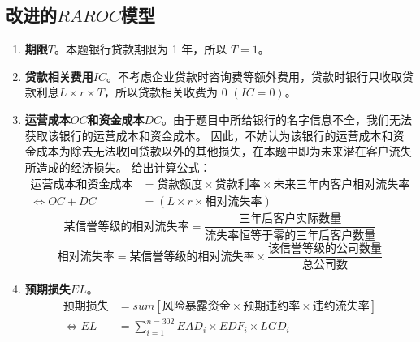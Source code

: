 \documentclass[withoutpreface,bwprint]{cumcmthesis}
\begin{document}
    \subsection{改进的$RAROC$模型}
        \begin{enumerate}
            \item \textbf{期限$T$}。本题银行贷款期限为 1 年，所以 $T = 1$。
            \item \textbf{贷款相关费用$IC$}。不考虑企业贷款时咨询费等额外费用，贷款时银行只收取贷款利息$L \times r \times T$，所以贷款相关收费为 0 $(IC = 0)$。
            \item \textbf{运营成本$OC$和资金成本$DC$}。由于题目中所给银行的名字信息不全，我们无法获取该银行的运营成本和资金成本。
                  因此，不妨认为该银行的运营成本和资金成本为除去无法收回贷款以外的其他损失，在本题中即为未来潜在客户流失所造成的经济损失。
                  给出计算公式：
                  \begin{equation}
                    \begin{split}
                      \text{运营成本和资金成本} &= \text{贷款额度} \times \text{贷款利率} \times \text{未来三年内客户相对流失率} \\
                        \iff OC + DC &= (L \times r \times \text{相对流失率}) 
                    \end{split}
                  \end{equation}
                  \begin{equation}
                      \text{某信誉等级的相对流失率} = \frac{\text{三年后客户实际数量}}{\text{流失率恒等于零的三年后客户数量}}
                  \end{equation}
                  \begin{equation}
                      \text{相对流失率} = \text{某信誉等级的相对流失率} \times \frac{\text{该信誉等级的公司数量}}{\text{总公司数}}
                  \end{equation}
            \item \textbf{预期损失$EL$}。
                  \begin{equation}
                    \begin{split}
                      \text{预期损失} &= sum [\text{风险暴露资金} \times \text{预期违约率} \times \text{违约流失率}] \\
                       \iff  EL      &= \sum_{i = 1}^{n = 302} EAD_i \times EDF_i \times LGD_i 
                    \end{split}
                  \end{equation} \par

\end{enumerate}
\end{document}
